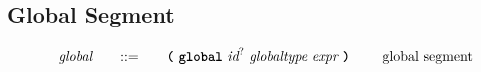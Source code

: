 \subsection{Global Segment}

\begin{alignat*}{9}
    && \textit{global}    &&\quad ::= &\quad && \textbf{\texttt{(}}\ \textbf{\texttt{global}}\ \textit{id}^?\ \textit{globaltype}\ \textit{expr}\ \textbf{\texttt{)}}\ \quad && \textrm{global segment} \\[1mm]
\end{alignat*}